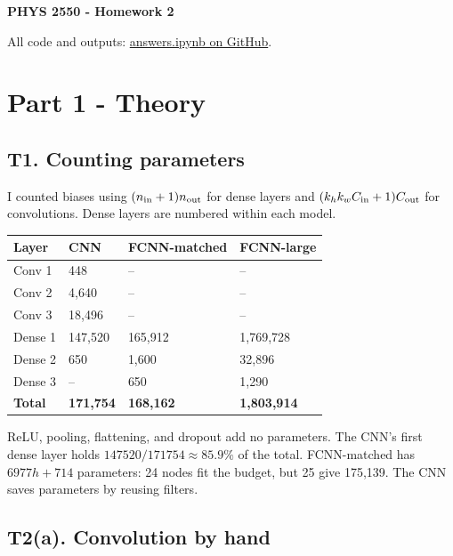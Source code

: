 \documentclass[11pt,a4paper]{article}
\begin{document}
{\fontsize{22}{26}\selectfont\bfseries PHYS 2550 - Homework 2\par}
\vspace{7pt}
All code and outputs: \href{https://github.com/aradhyajain430/phys-2550/blob/master/HW2/answers.ipynb}{answers.ipynb on GitHub}.



\section*{Part 1 - Theory}




\subsection*{T1. Counting parameters}

I counted biases using $(n_{\rm in}+1)n_{\rm out}$ for dense layers and $(k_hk_wC_{\rm in}+1)C_{\rm out}$ for convolutions. Dense layers are numbered within each model.

{\small\setlength{\tabcolsep}{4pt}
\begin{tabularx}{\linewidth}{|L|L|L|L|}
\hline
{}
\textbf{Layer} & \textbf{CNN} & \textbf{FCNN-matched} & \textbf{FCNN-large} \\ \hline
Conv 1 & 448 & -- & -- \\ \hline
Conv 2 & 4,640 & -- & -- \\ \hline
Conv 3 & 18,496 & -- & -- \\ \hline
Dense 1 & 147,520 & 165,912 & 1,769,728 \\ \hline
Dense 2 & 650 & 1,600 & 32,896 \\ \hline
Dense 3 & -- & 650 & 1,290 \\ \hline
\textbf{Total} & \textbf{171,754} & \textbf{168,162} & \textbf{1,803,914} \\ \hline
\end{tabularx}\par}

ReLU, pooling, flattening, and dropout add no parameters. The CNN's first dense layer holds $147520/171754\approx85.9\%$ of the total. FCNN-matched has $6977h+714$ parameters: 24 nodes fit the budget, but 25 give 175,139. The CNN saves parameters by reusing filters.


\subsection*{T2(a). Convolution by hand}
\end{document}

